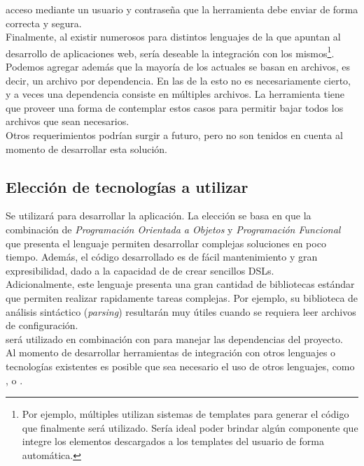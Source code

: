 acceso mediante un usuario y contraseña que la herramienta debe enviar de forma 
correcta y segura.\\
Finalmente, al existir numerosos \frameworks para distintos lenguajes de la 
\jvm que apuntan al desarrollo de aplicaciones web, sería deseable la 
integración con los mismos\footnote{
	Por ejemplo, múltiples \frameworks utilizan sistemas de templates para 
	generar el código \html que finalmente será utilizado. Sería ideal poder 
	brindar algún componente que integre los elementos descargados a los 
	templates del usuario de forma automática.
}.\\
Podemos agregar además que la mayoría de los \depmgrs actuales se basan en 
archivos, es decir, un archivo por dependencia. En las \dependencies de la 
\viewtier esto no es necesariamente cierto, y a veces una dependencia consiste 
en múltiples archivos. La herramienta tiene que proveer una forma de 
contemplar estos casos para permitir bajar todos los archivos que sean 
necesarios.\\
Otros requerimientos podrían surgir a futuro, pero no son tenidos en cuenta al 
momento de desarrollar esta solución.


\subsection{Elección de tecnologías a utilizar}
\label{subsec:solution:technology}

Se utilizará \scala para desarrollar la aplicación. La elección se basa en que 
la combinación de \emph{Programación Orientada a Objetos} y \emph{Programación 
	Funcional} que presenta el lenguaje permiten desarrollar complejas soluciones 
en poco tiempo. Además, el código desarrollado es de fácil mantenimiento 
y gran expresibilidad, dado a la capacidad de \scala de crear sencillos DSLs.\\
Adicionalmente, este lenguaje presenta una gran cantidad de bibliotecas 
estándar que permiten realizar rapidamente tareas complejas. Por ejemplo, su 
biblioteca de análisis sintáctico (\emph{parsing}) resultarán muy útiles cuando 
se requiera leer archivos de configuración.\\
\scala será utilizado en combinación con \sbt para manejar las dependencias del 
proyecto.\\
Al momento de desarrollar herramientas de integración con otros lenguajes o 
tecnologías existentes es posible que sea necesario el uso de otros lenguajes, 
como \java, \clojure o \groovy.


